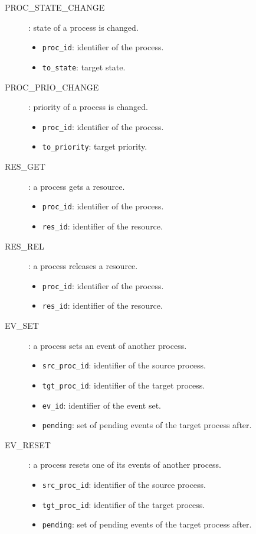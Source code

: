 \begin{description}
  \item[PROC\_STATE\_CHANGE]: state of a process is changed.
    \begin{itemize}
      \item \texttt{proc_id}: identifier of the process.
      \item \texttt{to_state}: target state.
    \end{itemize}

  \item[PROC\_PRIO\_CHANGE]: priority of a process is changed.
    \begin{itemize}
      \item \texttt{proc_id}: identifier of the process.
      \item \texttt{to_priority}: target priority.
    \end{itemize}

  \item[RES_GET]: a process gets a resource.
    \begin{itemize}
      \item \texttt{proc_id}: identifier of the process.
      \item \texttt{res_id}: identifier of the resource.
    \end{itemize}

  \item[RES_REL]: a process releases a resource.
    \begin{itemize}
      \item \texttt{proc_id}: identifier of the process.
      \item \texttt{res_id}: identifier of the resource.
    \end{itemize}

  \item[EV_SET]: a process sets an event of another process.
    \begin{itemize}
      \item \texttt{src_proc_id}: identifier of the source process.
      \item \texttt{tgt_proc_id}: identifier of the target process.
      \item \texttt{ev_id}: identifier of the event set.
      \item \texttt{pending}: set of pending events of the target process after.
    \end{itemize}

  \item[EV_RESET]: a process resets one of its events of another process.
    \begin{itemize}
      \item \texttt{src_proc_id}: identifier of the source process.
      \item \texttt{tgt_proc_id}: identifier of the target process.
      \item \texttt{pending}: set of pending events of the target process after.
    \end{itemize}


\end{description}
